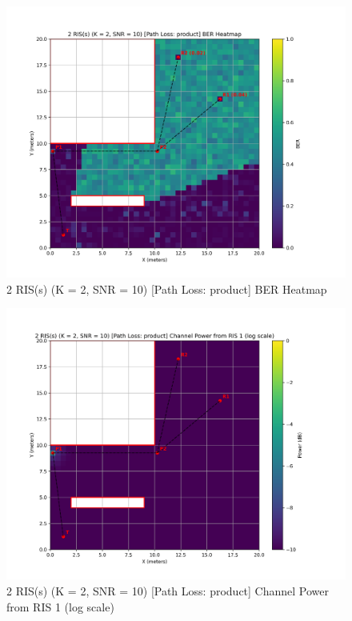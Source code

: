 \begin{figure}[H]
  \centering
  \includegraphics[width=0.8\linewidth]{imgs/heatmap-simulations/2 RIS(s) (K = 2, SNR = 10) [Path Loss_ product] BER Heatmap.png}
  \caption{2 RIS(s) (K = 2, SNR = 10) [Path Loss: product] BER Heatmap}
\end{figure}

\begin{figure}[H]
  \centering
  \includegraphics[width=0.8\linewidth]{imgs/heatmap-simulations/2 RIS(s) (K = 2, SNR = 10) [Path Loss_ product] Channel Power from RIS 1 (log scale).png}
  \caption{2 RIS(s) (K = 2, SNR = 10) [Path Loss: product] Channel Power from RIS 1 (log scale)}
\end{figure}

